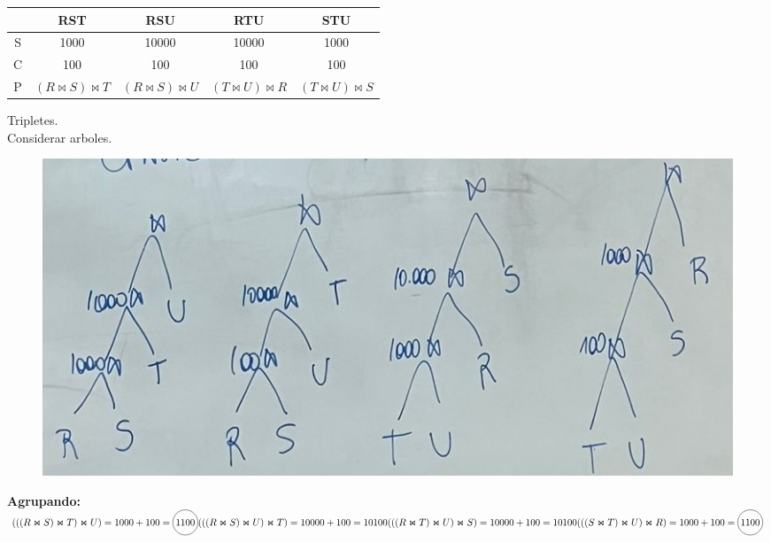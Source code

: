 \documentclass{templateNote}
\begin{document}
\begin{enumerate}
\begin{enumerate}[label=\alph*)]
                \begin{tabular}{|c|c|c|c|c|}
                    \hline
                    & RST & RSU & RTU & STU \\
                    \hline
                    S & 1000 & 10000 & 10000 & 1000 \\
                    \hline
                    C & 100 & 100 & 100 & 100  \\
                    \hline
                    P & $(R \Join S) \Join T$ & $(R \Join S) \Join U$ & $(T \Join U) \Join R$ & $(T \Join U) \Join S$ \\
                    \hline
                \end{tabular}
                
                \newpage
                \noindent Tripletes. \\Considerar arboles. \\

                \begin{figure}[H]
                    \centering
                    \includegraphics[width=\textwidth]{img/Imagen de WhatsApp 2024-07-08 a las 15.29.31_93439903.jpg}
                \end{figure}
                
                \noindent \textbf{Agrupando:} \\
                \begin{math}
                    (((R \Join S ) \Join T ) \Join U) = 1000 + 100 = \tikz[baseline=(char.base)]{\node[shape=circle,draw,inner sep=2pt] (char) {$1100$};} \\
                    (((R \Join S ) \Join U ) \Join T) = 10000 + 100 = 10100 \\
                    (((R \Join T ) \Join U ) \Join S) = 10000 + 100 = 10100 \\
                    (((S \Join T ) \Join U ) \Join R) = 1000 + 100 = \tikz[baseline=(char.base)]{\node[shape=circle,draw,inner sep=2pt] (char) {$1100$};} \\
                \end{math}


\end{enumerate}
\end{enumerate}
\end{document}

